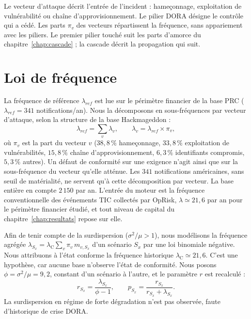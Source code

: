 Le vecteur d'attaque décrit l'entrée de l'incident : hameçonnage, exploitation de vulnérabilité
ou chaîne d'approvisionnement. Le pilier DORA désigne le contrôle qui a cédé.
Les parts $\pi_v$ des vecteurs répartissent la fréquence, sans appariement avec les piliers.
Le premier pilier touché suit les parts d'amorce du chapitre~\ref{chap:cascade} ; la cascade décrit la propagation qui suit.

\section{Loi de fréquence}

La fréquence de référence $\lambda_{ref}$ est lue sur le périmètre financier de la base PRC
($\lambda_{ref} = 341$ notifications/an). Nous la décomposons en sous-fréquences par vecteur
d'attaque, selon la structure de la base Hackmageddon :
\begin{equation}
\lambda_{ref} = \sum_{v} \lambda_v,
\qquad
\lambda_v = \lambda_{ref} \times \pi_v,
\end{equation}
où $\pi_v$ est la part du vecteur $v$ ($38{,}8\,\%$ hameçonnage, $33{,}8\,\%$ exploitation de
vulnérabilités, $15{,}8\,\%$ chaîne d'approvisionnement, $6{,}3\,\%$ identifiants compromis, $5{,}3\,\%$
autres). Un
défaut de conformité sur une exigence n'agit ainsi que sur la sous-fréquence du vecteur qu'elle
atténue. Les $341$ notifications américaines, sans seuil de matérialité, ne servent qu'à cette décomposition par vecteur. La base entière en compte $2\,150$ par an. L'entrée du
moteur est la fréquence conventionnelle des événements TIC collectés par OpRisk, $\lambda \simeq 21{,}6$ par an
pour le périmètre financier étudié, et tout niveau de capital du chapitre~\ref{chap:resultats}
repose sur elle.

Afin de tenir compte de la surdispersion ($\sigma^2/\mu > 1$), nous modélisons la fréquence agrégée
$\lambda_{S_x} = \lambda_{\text{C}}\sum_v \pi_v\, m_{v,S_x}$ d'un scénario $S_x$ par une loi binomiale
négative. Nous attribuons à l'état conforme la fréquence historique $\lambda_{\text{C}}\simeq 21{,}6$.
C'est une hypothèse, car aucune base n'observe l'état de conformité.
Nous posons $\phi = \sigma^2/\mu = 9{,}2$, constant d'un scénario à l'autre, et le paramètre
$r$ est recalculé :
\begin{equation}
r_{S_x} = \frac{\lambda_{S_x}}{\phi - 1},
\qquad
p_{S_x} = \frac{r_{S_x}}{r_{S_x} + \lambda_{S_x}}.
\end{equation}
La surdispersion en régime de forte dégradation n'est pas observée, faute
d'historique de crise DORA.

